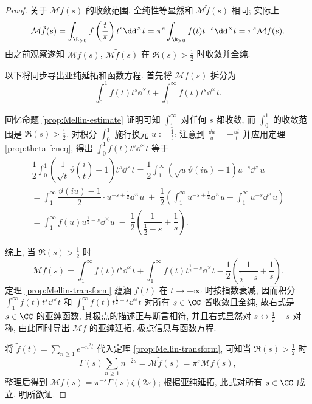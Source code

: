 \begin{proof}
	关于 $\mathcal{M}f(s)$ 的收敛范围, 全纯性等显然和 $\mathcal{M}\tilde{f}(s)$ 相同; 实际上
	\[ \mathcal{M}\tilde{f}(s) = \int_{\R_{>0}} f\left( \frac{t}{\pi} \right) t^s \dd^\times t = \pi^s \int_{\R_{>0}} f(t) t^{-s} \dd^\times t = \pi^s \mathcal{M}f(s). \]
	由之前观察遂知 $\mathcal{M}f(s)$, $\mathcal{M}\tilde{f}(s)$ 在 $\Re(s) > \frac{1}{2}$ 时收敛并全纯.
	
	以下将同步导出亚纯延拓和函数方程. 首先将 $\mathcal{M}f(s)$ 拆分为
	\[ \int_0^1 f(t) t^s \dd^\times t + \int_1^\infty f(t) t^s \dd^\times t. \]

	回忆命题 \ref{prop:Mellin-estimate} 证明可知 $\int_1^\infty$ 对任何 $s$ 都收敛, 而 $\int_0^1$ 的收敛范围是 $\Re(s) > \frac{1}{2}$. 对积分 $\int_0^1$ 施行换元 $u := \frac{1}{t}$: 注意到 $\frac{\dd u}{u} = - \frac{\dd t}{t}$ 并应用定理 \ref{prop:theta-fcneq}, 得出 $\int_0^1 f(t) t^s \dd^\times t$ 等于
	\begin{multline*}
		\dfrac{1}{2} \int_0^1 \left( \dfrac{1}{\sqrt{t}} \vartheta\left( \dfrac{i}{t} \right) - 1 \right) t^s \dd^\times t
		= \dfrac{1}{2} \int_1^\infty \left( \sqrt{u} \vartheta\left( iu \right) - 1 \right) u^{-s} \dd^\times u \\
		= \int_1^\infty \dfrac{\vartheta(iu) - 1}{2} \cdot u^{-s + \frac{1}{2}} \dd^\times u \; + \; \dfrac{1}{2} \left( \int_1^\infty u^{-s + \frac{1}{2}} \dd^\times u - \int_1^\infty u^{-s} \dd^\times u \right) \\
		= \int_1^\infty f(u) u^{\frac{1}{2} - s} \dd^\times u \; - \; \dfrac{1}{2} \left( \dfrac{1}{\frac{1}{2} - s} + \dfrac{1}{s} \right).
	\end{multline*}

	综上, 当 $\Re(s) > \frac{1}{2}$ 时
	\[ \mathcal{M}f(s) = \int_1^\infty f(t) t^s \dd^\times t + \int_1^\infty f(t) t^{\frac{1}{2} - s} \dd^\times t - \dfrac{1}{2} \left( \dfrac{1}{\frac{1}{2} - s} + \dfrac{1}{s} \right). \]
	定理 \ref{prop:Mellin-transform} 蕴涵 $f(t)$ 在 $t \to +\infty$ 时按指数衰减, 因而积分 $\int_1^\infty f(t) t^s \dd^\times t$ 和 $\int_1^\infty f(t) t^{\frac{1}{2} - s} \dd^\times t$ 对所有 $s \in \CC$ 皆收敛且全纯, 故右式是 $s \in \CC$ 的亚纯函数, 其极点的描述正与断言相符, 并且右式显然对 $s \leftrightarrow \frac{1}{2} -s$ 对称, 由此同时导出 $\mathcal{M}f$ 的亚纯延拓, 极点信息与函数方程.

	将 $\tilde{f}(t) = \sum_{n \geq 1} e^{-n^2 t}$ 代入定理 \ref{prop:Mellin-transform}, 可知当 $\Re(s) > \frac{1}{2}$ 时
	\[ \Gamma(s) \sum_{n \geq 1} n^{-2s} = \mathcal{M}\tilde{f}(s) = \pi^s \mathcal{M}f(s), \]
	整理后得到 $\mathcal{M}f(s) = \pi^{-s} \Gamma(s) \zeta(2s)$; 根据亚纯延拓, 此式对所有 $s \in \CC$ 成立. 明所欲证.
\end{proof}

